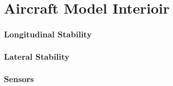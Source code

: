 \newpage
\section{Aircraft Model Interioir}




\subsubsection{Longitudinal Stability}
\subsubsection{Lateral Stability}




\subsubsection{Sensors}

